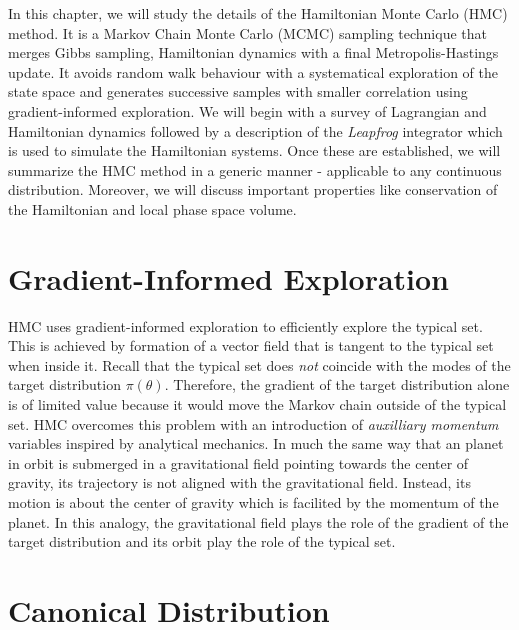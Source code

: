 In this chapter, we will study the details of the Hamiltonian Monte Carlo (HMC) method.
It is a Markov Chain Monte Carlo (MCMC) sampling technique that merges Gibbs sampling, 
Hamiltonian dynamics with a final Metropolis-Hastings update.
It avoids random walk behaviour with a systematical exploration of the state space 
and generates successive samples with smaller correlation using gradient-informed exploration. 
We will begin with a survey of Lagrangian and Hamiltonian dynamics followed by a description of
the \textit{Leapfrog} integrator which is used to simulate the Hamiltonian systems. Once these are established, we will summarize the 
HMC method in a generic manner - applicable to any continuous distribution. Moreover, we will discuss important properties like conservation of the Hamiltonian
and local phase space volume.


\section{Gradient-Informed Exploration}
HMC uses gradient-informed exploration to efficiently explore the typical set.
This is achieved by formation of a vector field that is tangent to the typical set when inside it. Recall that the typical set does \textit{not} coincide with the modes of the target
distribution $\pi(\theta)$. Therefore, the gradient of the target distribution alone is of limited
value because it would move the Markov chain outside of the typical set. HMC overcomes this
problem with an introduction of \textit{auxilliary momentum} variables inspired by analytical mechanics. In much the same way that an planet in orbit is submerged in a gravitational field pointing towards the center of gravity, its trajectory is not aligned with the gravitational field.
Instead, its motion is about the center of gravity which is facilited by the momentum of the planet. In this analogy, the gravitational field plays the role of the gradient of the target distribution and its orbit play the role of the typical set.

\section{Canonical Distribution}


